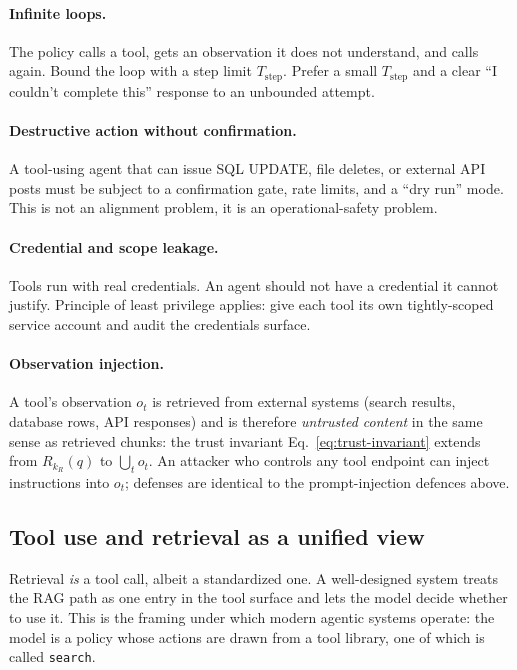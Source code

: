 \paragraph{Infinite loops.} The policy calls a tool, gets an
observation it does not understand, and calls again. Bound the
loop with a step limit $T_\mathrm{step}$. Prefer a small
$T_\mathrm{step}$ and a clear ``I couldn't complete this'' response
to an unbounded attempt.

\paragraph{Destructive action without confirmation.} A tool-using
agent that can issue SQL UPDATE, file deletes, or external API
posts must be subject to a confirmation gate, rate limits, and a
``dry run'' mode. This is not an alignment problem, it is an
operational-safety problem.

\paragraph{Credential and scope leakage.} Tools run with real
credentials. An agent should not have a credential it cannot
justify. Principle of least privilege applies: give each tool its
own tightly-scoped service account and audit the credentials
surface.

\paragraph{Observation injection.} A tool's observation $o_t$ is
retrieved from external systems (search results, database rows,
API responses) and is therefore \emph{untrusted content} in the
same sense as retrieved chunks: the trust invariant
Eq.~\eqref{eq:trust-invariant} extends from $R_{k_R}(q)$ to
$\bigcup_t o_t$. An attacker who controls any tool endpoint can
inject instructions into $o_t$; defenses are identical to the
prompt-injection defences above.

\subsection{Tool use and retrieval as a unified view}

Retrieval \emph{is} a tool call, albeit a standardized one. A
well-designed system treats the RAG path as one entry in the tool
surface and lets the model decide whether to use it. This is the
framing under which modern agentic systems operate: the model is a
policy whose actions are drawn from a tool library, one of which
is called \texttt{search}.

